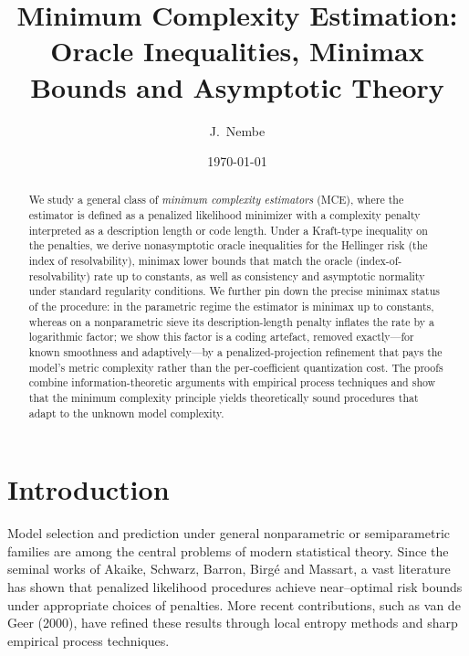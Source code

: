 \documentclass[12pt]{article}
\numberwithin{equation}{section}
\begin{document}
	
	\title{Minimum Complexity Estimation:\\
		Oracle Inequalities, Minimax Bounds and Asymptotic Theory}
	\author{J.~Nembe}
	\date{\today}
	\maketitle
	
	\begin{abstract}
		We study a general class of \emph{minimum complexity estimators} (MCE),
		where the estimator is defined as a penalized likelihood minimizer with
		a complexity penalty interpreted as a description length or code length.
		Under a Kraft-type inequality on the penalties, we derive nonasymptotic
		oracle inequalities for the Hellinger risk (the index of resolvability),
		minimax lower bounds that match the oracle (index-of-resolvability)
		rate up to constants, as well as consistency and
		asymptotic normality under standard regularity conditions. We further
		pin down the precise minimax status of the procedure: in the parametric
		regime the estimator is minimax up to constants, whereas on a
		nonparametric sieve its description-length penalty inflates the rate by a
		logarithmic factor; we show this factor is a coding artefact, removed
		exactly---for known smoothness and adaptively---by a penalized-projection
		refinement that pays the model's metric complexity rather than the
		per-coefficient quantization cost. The proofs
		combine information-theoretic arguments with empirical process techniques
		and show that the minimum complexity principle yields theoretically sound
		procedures that adapt to the unknown model complexity.
	\end{abstract}
	
	\tableofcontents
	
\section{Introduction}

Model selection and prediction under general nonparametric or
semiparametric families are among the central problems of modern
statistical theory.  Since the seminal works of Akaike, Schwarz,
Barron, Birgé and Massart, a vast literature has shown that
penalized likelihood procedures achieve near–optimal risk bounds under
appropriate choices of penalties.  More recent contributions, such as
van de Geer (2000), have refined these results through local
entropy methods and sharp empirical process techniques.
\end{document}
